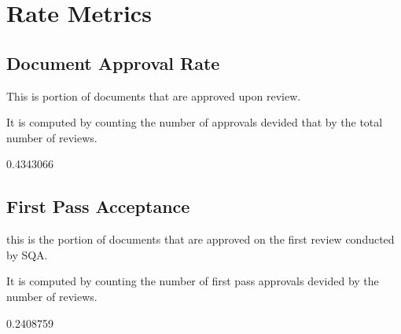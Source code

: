 \documentclass{article}
\begin{document}
\section{Rate Metrics}
\subsection{Document Approval Rate}
This is portion of documents that are approved upon review.

It is computed by counting the number of approvals devided that by the total number of reviews.

\begin{Schunk}
\begin{Soutput}
[1] 0.4343066
\end{Soutput}
\end{Schunk}

\subsection{First Pass Acceptance}
this is the portion of documents that are approved on the first review conducted
by SQA.

It is computed by counting the number of first pass approvals devided by
the number of reviews.

\begin{Schunk}
\begin{Soutput}
[1] 0.2408759
\end{Soutput}
\end{Schunk}
\end{document}
